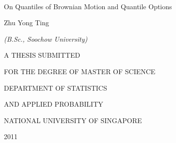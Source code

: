 \thispagestyle{empty}

\begin{titlepage}
\ 
\vspace{4cm}
\begin{center}\Huge 
On Quantiles of Brownian Motion and Quantile Options

\vfill

\Large
Zhu Yong Ting

\textit{(B.Sc., Soochow University)}

\vfill

\Large
A THESIS SUBMITTED

\vspace{1em}

FOR THE DEGREE OF MASTER OF SCIENCE

\vspace{1em}

DEPARTMENT OF STATISTICS 

\vspace{1em}

AND APPLIED PROBABILITY

\vspace{1em}
\Large
NATIONAL UNIVERSITY OF SINGAPORE

\vspace{1em}

2011

\end{center}

\vspace*{1cm}

\end{titlepage}

\setcounter{page}{1}
